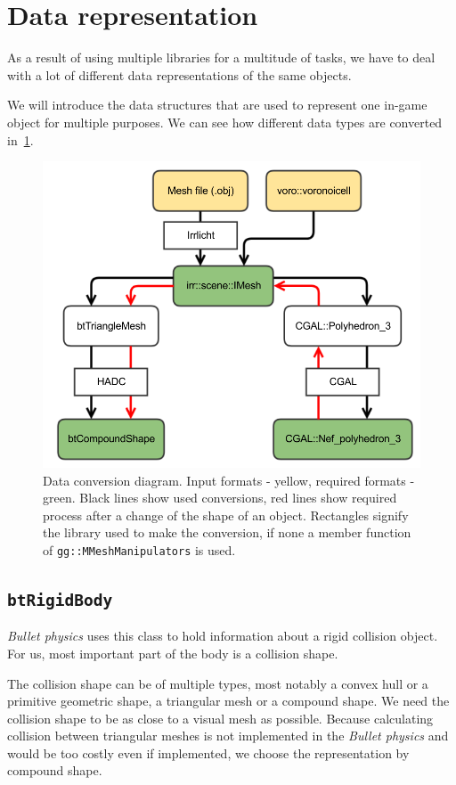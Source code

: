 \section{Data representation}
As a result of using multiple libraries for a multitude of tasks, we have to deal with a lot of different data representations of the same objects. 

We will introduce the data structures that are used to represent one in-game object for multiple purposes. We can see how different data types are converted in~\cref{fig:conversions}.

\begin{figure}
        \centering
        \includegraphics[width=\textwidth]{img/conversions}
        \caption{Data conversion diagram. Input formats - yellow, required formats - green. Black lines show used conversions, red lines show required process after a change of the shape of an object. Rectangles signify the library used to make the conversion, if none a member function of {\tt gg::MMeshManipulators} is used.}
        \label{fig:conversions}
\end{figure}

\subsection*{\tt btRigidBody}
\emph{Bullet physics} uses this class to hold information about a rigid collision object. For us, most important part of the body is a collision shape.

The collision shape can be of multiple types, most notably a convex hull or a primitive geometric shape, a triangular mesh or a compound shape. We need the collision shape to be as close to a visual mesh as possible. Because calculating collision between triangular meshes is not implemented in the \emph{Bullet physics} and would be too costly even if implemented, we choose the representation by compound shape.

